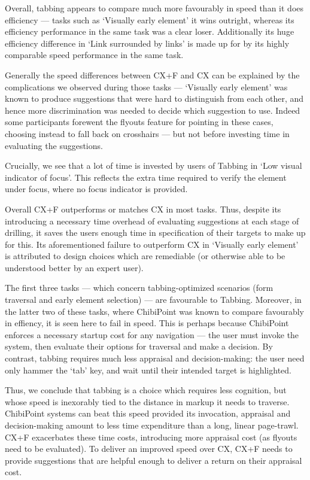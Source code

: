 \documentclass[a4paper, 12pt]{report}
\begin{document}
Overall, tabbing appears to compare much more favourably in speed than it does efficiency --- tasks such as `Visually early element' it wins outright, whereas its efficiency performance in the same task was a clear loser. Additionally its huge efficiency difference in `Link surrounded by links' is made up for by its highly comparable speed performance in the same task.

Generally the speed differences between CX+F and CX can be explained by the complications we observed during those tasks --- `Visually early element' was known to produce suggestions that were hard to distinguish from each other, and hence more discrimination was needed to decide which suggestion to use. Indeed some participants forewent the flyouts feature for pointing in these cases, choosing instead to fall back on crosshairs --- but not before investing time in evaluating the suggestions.

Crucially, we see that a lot of time is invested by users of Tabbing in `Low visual indicator of focus'. This reflects the extra time required to verify the element under focus, where no focus indicator is provided.

Overall CX+F outperforms or matches CX in most tasks. Thus, despite its introducing a necessary time overhead of evaluating suggestions at each stage of drilling, it saves the users enough time in specification of their targets to make up for this. Its aforementioned failure to outperform CX in `Visually early element' is attributed to design choices which are remediable (or otherwise able to be understood better by an expert user).

The first three tasks --- which concern tabbing-optimized scenarios (form traversal and early element selection) --- are favourable to Tabbing. Moreover, in the latter two of these tasks, where ChibiPoint was known to compare favourably in effiency, it is seen here to fail in speed. This is perhaps because ChibiPoint enforces a necessary startup cost for any navigation --- the user must invoke the system, then evaluate their options for traversal and make a decision. By contrast, tabbing requires much less appraisal and decision-making: the user need only hammer the `tab' key, and wait until their intended target is highlighted.

Thus, we conclude that tabbing is a choice which requires less cognition, but whose speed is inexorably tied to the distance in markup it needs to traverse. ChibiPoint systems can beat this speed provided its invocation, appraisal and decision-making amount to less time expenditure than a long, linear page-trawl. CX+F exacerbates these time costs, introducing more appraisal cost (as flyouts need to be evaluated). To deliver an improved speed over CX, CX+F needs to provide suggestions that are helpful enough to deliver a return on their appraisal cost.
\end{document}
